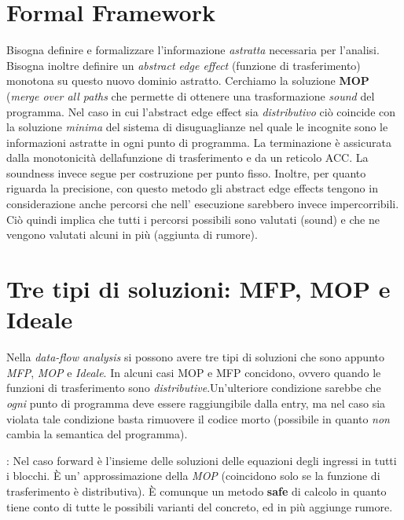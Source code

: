 \documentclass[a4paper,12pt,openany]{article}
\newenvironment{definition}[1][Definizione]{\begin{trivlist}
\item[\hskip \labelsep {\bfseries #1}]}{\end{trivlist}}
\begin{document}
\newpage

\section{Formal Framework}
Bisogna definire e formalizzare l'informazione \emph{astratta} necessaria per l'analisi. Bisogna inoltre
definire un \emph{abstract edge effect} (funzione di trasferimento) monotona su questo nuovo dominio astratto.
Cerchiamo la soluzione \textbf{MOP} (\emph{merge over all paths} che permette di ottenere una trasformazione
\emph{sound} del programma. Nel caso in cui l'abstract edge effect sia \emph{distributivo} ciò coincide con
la soluzione \emph{minima} del sistema di disuguaglianze nel quale le incognite sono le informazioni astratte
in ogni punto di programma.
\newline
La terminazione è assicurata dalla monotonicità dellafunzione di trasferimento e da un reticolo ACC. La
soundness invece segue per costruzione per punto fisso. Inoltre, per quanto riguarda la precisione, con
questo metodo gli abstract edge effects tengono in considerazione anche percorsi che nell' esecuzione 
sarebbero invece impercorribili. Ciò quindi implica che tutti i percorsi possibili sono valutati (sound) e che
ne vengono valutati alcuni in più (aggiunta di rumore).

\section{Tre tipi di soluzioni: MFP, MOP e Ideale}
Nella \emph{data-flow analysis} si possono avere tre tipi di soluzioni che sono appunto \emph{MFP}, \emph{MOP}
e \emph{Ideale}. In alcuni casi MOP e MFP concidono, ovvero quando le funzioni di trasferimento sono 
\emph{distributive}.Un'ulteriore condizione sarebbe che \emph{ogni} punto di programma deve essere 
raggiungibile dalla entry, ma nel caso sia violata tale condizione basta rimuovere il codice morto (possibile
in quanto \emph{non} cambia la semantica del programma).

\begin{definition}[MFP (maximum fixed point)]: 
    Nel caso forward è l'insieme delle soluzioni delle equazioni degli ingressi in tutti i blocchi. È un'
    approssimazione della \emph{MOP} (coincidono solo se la funzione di trasferimento è distributiva).
    È comunque un metodo \textbf{safe} di calcolo in quanto tiene conto di tutte le possibili varianti
    del concreto, ed in più aggiunge rumore.
\end{definition}
\end{document}
